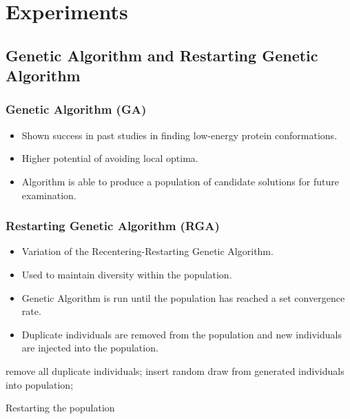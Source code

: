 \documentclass[10pt]{beamer}
\begin{document}
\section{Experiments}

\subsection{Genetic Algorithm and Restarting Genetic Algorithm}

\begin{frame}
	\frametitle{Genetic Algorithm (GA)}

	\begin{itemize}
		\item Shown success in past studies in finding low-energy protein conformations.
		\item Higher potential of avoiding local optima.
		\item Algorithm is able to produce a population of candidate solutions for future examination.
	\end{itemize}

\end{frame}

\begin{frame}
	\frametitle{Restarting Genetic Algorithm (RGA)}

	\begin{itemize}
		\item Variation of the Recentering-Restarting Genetic Algorithm.
		\item Used to maintain diversity within the population.
		\item Genetic Algorithm is run until the population has reached a set convergence rate.
		\item Duplicate individuals are removed from the population and new individuals are injected into the population.
	\end{itemize}

	\begin{algorithm}[H]
		\begin{algorithmic}[1]

		  \STATE remove all duplicate individuals;
			\STATE insert random draw from generated individuals into population;
		  \ENDWHILE
		\ENDIF

		\end{algorithmic}
		\caption{Restarting the population}
	\end{algorithm}

\end{frame}
\end{document}
